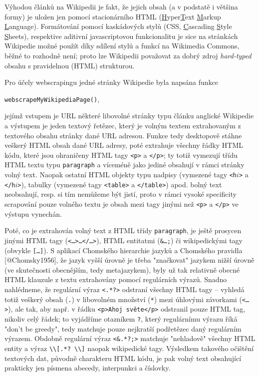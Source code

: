 Výhodou článků na Wikipedii je fakt, že jejich obsah (a v podstatě i většina formy) je uložen jen pomocí stacionárního HTML (\underline{H}yper\underline{T}ext \underline{M}arkup \underline{L}anguage). Formátování pomocí kaskádových stylů (CSS, \underline{C}ascading \underline{S}tyle \underline{S}heets), respektive aditivní javascriptovou funkcionalitu je sice na stránkách Wikipedie možné použít díky sdílení stylů a funkcí na Wikimedia Commons, běžné to rozhodně není; proto lze Wikipedii považovat za dobrý zdroj \textit{hard-typed} obsahu s pravidelnou (HTML) strukturou.

Pro účely webscrapingu jedné stránky Wikipedie byla napsána funkce

\begin{center}
\texttt{webscrapeMyWikipediaPage()},
\end{center}

jejímž vstupem je URL některé libovolné stránky typu článku anglické Wikipedie a výstupem je jeden textový řetězec, který je volným textem extrahovaným z textového obsahu stránky dané URL adresou. Funkce tedy desktopově stáhne veškerý HTML obsah dané URL adresy, poté extrahuje všechny řádky HTML kódu, které jsou ohraničeny HTML tagy \texttt{<p>} a \texttt{</p>}; ty totiž vymezují třídu HTML textu typu \texttt{paragraph} a víceméně jako jediné obsahují v rámci stránky volný text. Naopak ostatní HTML objekty typu nadpisy (vymezené tagy \texttt{<h$i$>} a \texttt{</h$i$>}), tabulky (vymezené tagy \texttt{<table>} a \texttt{</table>}) apod. bolný text neobsahují, resp. si tím nemůžeme být jistí, proto v rámci vysoké specificity scrapování pouze volného textu je obsah mezi tagy jinými než \texttt{<p>} a \texttt{</p>} ve výstupu vynechán.


Poté, co je extrahován volný text z HTML třídy \texttt{paragraph}, je ještě prosycen jinými HTML tagy (\texttt{<\ldots>\ldots</\ldots>}), HTML entitatmi (\texttt{\&\ldots;}) či wikipedickými tagy (obvykle \texttt{[\ldots]}). S aplikací Chomského hierarchie jazyků a Chomského pravidla [@Chomsky1956], že jazyk vyšší úrovně je třeba "značkovat" jazykem nižší úrovně (ve skutečnosti obecnějším, tedy metajazykem), byly už tak relativně obecné HTML klauzule z textu extrahovány pomocí regulárních výrazů. Snadno nahlédneme, že regulární výraz \texttt{<.*?>} odstraní všechny HTML tagy -- vyhledá totiž veškerý obsah (\texttt{.}) v libovolném množství (\texttt{*}) mezi úhlovými závorkami (\texttt{<\ldots>}), ale tak, aby např. v řádku \texttt{<p>Ahoj světe</p>} odstranil pouze HTML tag, nikoliv celý řádek; to vyjádříme otazníkem \texttt{?}, který regulárnímu výrazu říká "don't be greedy", tedy matchuje pouze nejkratší podřetězec daný regulárním výrazem. Obdobně regulární výraz \texttt{<\&.*?;>} matchuje "nehladově" všechny HTML entity a výraz \texttt{\textbackslash \textbackslash [.*? \textbackslash \textbackslash ]} naopak wikipedické tagy. Výsledkem takového očištění textových dat, původně charakteru HTML kódu, je pak volný text obsahující prakticky jen písmena abecedy, interpunkci a číslovky.


